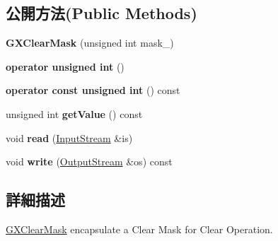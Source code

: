 \subsection*{公開方法(Public Methods)}
\begin{DoxyCompactItemize}
\item 
{\bfseries G\+X\+Clear\+Mask} (unsigned int mask\+\_)\hypertarget{class_i_dream_sky_1_1_g_x_clear_mask_a0834d43a45c5215af15551ba587bd279}{}\label{class_i_dream_sky_1_1_g_x_clear_mask_a0834d43a45c5215af15551ba587bd279}

\item 
{\bfseries operator unsigned int} ()\hypertarget{class_i_dream_sky_1_1_g_x_clear_mask_adc9505639386d82359b2f80c5b4742d4}{}\label{class_i_dream_sky_1_1_g_x_clear_mask_adc9505639386d82359b2f80c5b4742d4}

\item 
{\bfseries operator const unsigned int} () const \hypertarget{class_i_dream_sky_1_1_g_x_clear_mask_a5d5747d390a9dd17b467d0c511112c92}{}\label{class_i_dream_sky_1_1_g_x_clear_mask_a5d5747d390a9dd17b467d0c511112c92}

\item 
unsigned int {\bfseries get\+Value} () const \hypertarget{class_i_dream_sky_1_1_g_x_clear_mask_a352f734082827ed4017a77bec752252d}{}\label{class_i_dream_sky_1_1_g_x_clear_mask_a352f734082827ed4017a77bec752252d}

\item 
void {\bfseries read} (\hyperlink{class_i_dream_sky_1_1_input_stream}{Input\+Stream} \&is)\hypertarget{class_i_dream_sky_1_1_g_x_clear_mask_a7d580847dd2a30c4b355c67f7ee8ef09}{}\label{class_i_dream_sky_1_1_g_x_clear_mask_a7d580847dd2a30c4b355c67f7ee8ef09}

\item 
void {\bfseries write} (\hyperlink{class_i_dream_sky_1_1_output_stream}{Output\+Stream} \&os) const \hypertarget{class_i_dream_sky_1_1_g_x_clear_mask_a7ce1283240d4759f7fef00f3657ea084}{}\label{class_i_dream_sky_1_1_g_x_clear_mask_a7ce1283240d4759f7fef00f3657ea084}

\end{DoxyCompactItemize}


\subsection{詳細描述}
\hyperlink{class_i_dream_sky_1_1_g_x_clear_mask}{G\+X\+Clear\+Mask} encapsulate a Clear Mask for Clear Operation. 

